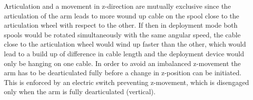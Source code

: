 Articulation and a movement in z-direction are mutually exclusive since the articulation of the arm leads to more wound up cable on the spool close to the articulation wheel with respect to the other. If then in deployment mode both spools would be rotated simultaneously with the same angular speed, the cable close to the articulation wheel would wind up faster than the other, which would lead to a build up of difference in cable length and the deployment device would only be hanging on one cable. In order to avoid an imbalanced z-movement the arm has to be dearticulated fully before a change in z-position can be initiated. This is enforced by an electric switch preventing z-movement, which is disengaged only when the arm is fully dearticulated (vertical). 


